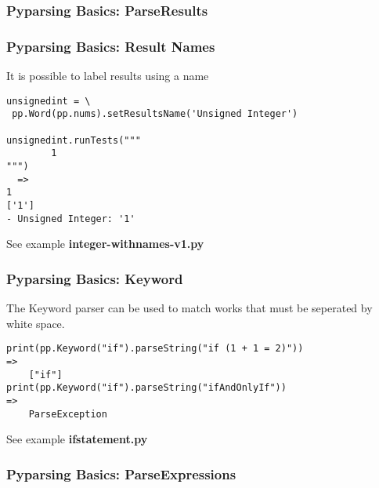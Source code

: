 \documentclass{beamer}
\begin{document}
\begin{frame}[fragile]
\frametitle{Pyparsing Basics: ParseResults}
\begin{center}
\end{center}
\end{frame}


\begin{frame}[fragile]
\frametitle{Pyparsing Basics: Result Names}
It is possible to label results using a name
\begin{verbatim}
unsignedint = \
 pp.Word(pp.nums).setResultsName('Unsigned Integer')

unsignedint.runTests("""
        1
""") 
  =>
1
['1']
- Unsigned Integer: '1'
\end{verbatim}
See example \textbf{integer-withnames-v1.py}
\end{frame}


\begin{frame}[fragile]
\frametitle{Pyparsing Basics: Keyword}
The Keyword parser can be used to match works that must be seperated by white space.
\begin{verbatim}
print(pp.Keyword("if").parseString("if (1 + 1 = 2)"))
=>
	["if"]
print(pp.Keyword("if").parseString("ifAndOnlyIf"))
=>
 	ParseException
\end{verbatim}
See example \textbf{ifstatement.py}
\end{frame}


\begin{frame}
\frametitle{Pyparsing Basics: ParseExpressions}

\begin{center}
\end{center}

\end{frame}
\end{document}
